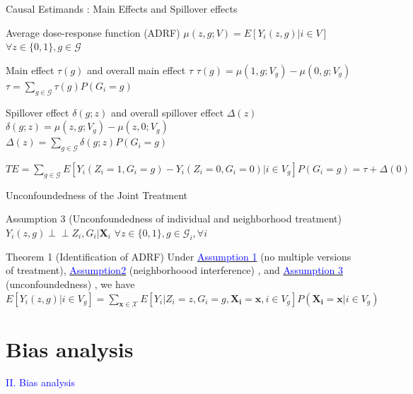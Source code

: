 \documentclass[notes,11pt, aspectratio=169]{beamer}
\begin{document}
\begin{frame}{Causal Estimands : Main Effects and Spillover effects}
\begin{block}{Average dose-response function
(ADRF)}
\centering
$\mu(z,g;V)=E[Y_i(z,g)|i \in V]$ \qquad $\forall z \in \{0,1\}, g \in \mathcal{G}$
\end{block}  
%
\begin{block}{Main effect $\tau(g)$ and overall main effect $\tau$}
\centering
$\tau(g)=\mu(1,g;V_g)-\mu(0,g;V_g)$
\\
\centering
$\tau=\sum_{g \in \mathcal{G}} \tau(g)P(G_i=g)$
\end{block}  
%
\begin{block}{Spillover effect $\delta(g;z)$ and overall spillover effect $\Delta(z)$}
\centering
$\delta(g;z)=\mu(z,g;V_g)-\mu(z,0;V_g)$
\\
\centering
$\Delta(z)=\sum_{g \in \mathcal{G}} \delta(g;z)P(G_i=g)$
\end{block}  
%
\centering
$ TE= \sum_{g \in \mathcal{G}}E[Y_i(Z_i=1,G_i=g)-Y_i(Z_i=0,G_i=0)| i \in V_g]P(G_i=g)=\tau +\Delta(0)
$
\end{frame}




\begin{frame}{Unconfoundedness of the Joint Treatment}
\begin{block}{Assumption 3 (Unconfoundedness of individual and neighborhood treatment)}\label{assump3}
\centering
$Y_i(z,g) \perp\!\!\!\perp Z_i,G_i|\mathbf{X}_i$ \qquad $\forall z \in \{0,1\} , g \in \mathcal{G}_i , \forall i$
\end{block}
\vspace{1em}
%
\begin{block}{Theorem 1 (Identification of ADRF)}
Under  \hyperlink{assump1}{\textcolor{blue}{Assumption 1}} (no multiple versions of treatment), \hyperlink{assump2}{\textcolor{blue}{Assumption2}} (neighborhoood interference) , and \hyperlink{assump3}{\textcolor{blue}{Assumption 3}} (unconfoundedness) , we have 
\\
\centering
$E[Y_i(z,g)|i \in V_g]= \sum_{\mathbf{x} \in \mathcal{X}}E[Y_i|Z_i=z,G_i=g,\mathbf{X_i}=\mathbf{x}, i \in V_g]P(\mathbf{X_i}=\mathbf{x} | i \in V_g) $
\end{block}
\end{frame}



\section{Bias analysis}
\begin{transitionframe}
  \begin{center}
    { \Huge \textcolor{blue}{II. Bias analysis}}
  \end{center}
\end{transitionframe}
\end{document}
